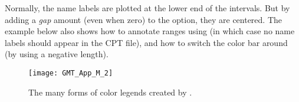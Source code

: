 Normally, the name labels are plotted at the lower end of the intervals. But by adding a \emph{gap} amount (even when zero) to the  option, they are centered. The example below also shows how to annotate ranges using  (in which case no name labels should appear in the CPT file), and how to switch the color bar around (by using a negative length).


\begin{figure}[h]
\centering
\texttt{[image: GMT\_App\_M\_2]}
\caption{The many forms of color legends created by \protect{}.}
\label{fig:GMT_App_M_2}
\end{figure}
